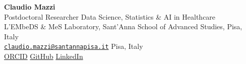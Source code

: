 \documentclass[10pt,a4paper]{article}
\begin{document}

\begin{center}
    {\Huge \textbf{\color{primary} Claudio Mazzi}}\\[3pt]
    {\large \color{secondary} Postdoctoral Researcher \;\textbar\; Data Science, Statistics \& AI in Healthcare}\\[4pt]
    
    \small \color{textdark}
    L'EMbeDS \& MeS Laboratory, Sant'Anna School of Advanced Studies, Pisa, Italy\\[3pt]
    
    \faEnvelope\; \href{mailto:claudio.mazzi@santannapisa.it}{\texttt{claudio.mazzi@santannapisa.it}} \quad
    \faMapMarker*\; Pisa, Italy \\
    \href{https://orcid.org/0009-0007-9407-9897}{\faOrcid\; ORCID} \quad\textbullet\quad
    \href{https://github.com/claudiomzi}{\faGithub\; GitHub} \quad\textbullet\quad
    \href{https://linkedin.com/in/claudio-mazzi/?isSelfProfile=true}{\faLinkedin\; LinkedIn}
\end{center}

\vspace{-4pt}

\end{document}
